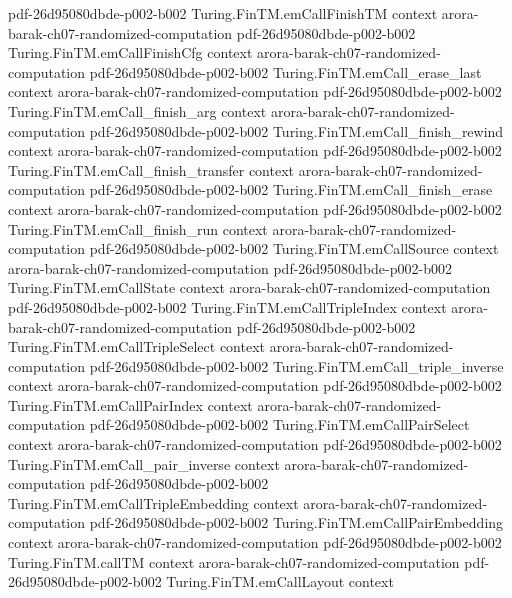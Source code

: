 \begin{theorem}
  {pdf-26d95080dbde-p002-b002}
\proofstep
  {Turing.FinTM.emCallFinishTM}
  {context}
  {arora-barak-ch07-randomized-computation}
  {pdf-26d95080dbde-p002-b002}
\proofstep
  {Turing.FinTM.emCallFinishCfg}
  {context}
  {arora-barak-ch07-randomized-computation}
  {pdf-26d95080dbde-p002-b002}
\proofstep
  {Turing.FinTM.emCall_erase_last}
  {context}
  {arora-barak-ch07-randomized-computation}
  {pdf-26d95080dbde-p002-b002}
\proofstep
  {Turing.FinTM.emCall_finish_arg}
  {context}
  {arora-barak-ch07-randomized-computation}
  {pdf-26d95080dbde-p002-b002}
\proofstep
  {Turing.FinTM.emCall_finish_rewind}
  {context}
  {arora-barak-ch07-randomized-computation}
  {pdf-26d95080dbde-p002-b002}
\proofstep
  {Turing.FinTM.emCall_finish_transfer}
  {context}
  {arora-barak-ch07-randomized-computation}
  {pdf-26d95080dbde-p002-b002}
\proofstep
  {Turing.FinTM.emCall_finish_erase}
  {context}
  {arora-barak-ch07-randomized-computation}
  {pdf-26d95080dbde-p002-b002}
\proofstep
  {Turing.FinTM.emCall_finish_run}
  {context}
  {arora-barak-ch07-randomized-computation}
  {pdf-26d95080dbde-p002-b002}
\proofstep
  {Turing.FinTM.emCallSource}
  {context}
  {arora-barak-ch07-randomized-computation}
  {pdf-26d95080dbde-p002-b002}
\proofstep
  {Turing.FinTM.emCallState}
  {context}
  {arora-barak-ch07-randomized-computation}
  {pdf-26d95080dbde-p002-b002}
\proofstep
  {Turing.FinTM.emCallTripleIndex}
  {context}
  {arora-barak-ch07-randomized-computation}
  {pdf-26d95080dbde-p002-b002}
\proofstep
  {Turing.FinTM.emCallTripleSelect}
  {context}
  {arora-barak-ch07-randomized-computation}
  {pdf-26d95080dbde-p002-b002}
\proofstep
  {Turing.FinTM.emCall_triple_inverse}
  {context}
  {arora-barak-ch07-randomized-computation}
  {pdf-26d95080dbde-p002-b002}
\proofstep
  {Turing.FinTM.emCallPairIndex}
  {context}
  {arora-barak-ch07-randomized-computation}
  {pdf-26d95080dbde-p002-b002}
\proofstep
  {Turing.FinTM.emCallPairSelect}
  {context}
  {arora-barak-ch07-randomized-computation}
  {pdf-26d95080dbde-p002-b002}
\proofstep
  {Turing.FinTM.emCall_pair_inverse}
  {context}
  {arora-barak-ch07-randomized-computation}
  {pdf-26d95080dbde-p002-b002}
\proofstep
  {Turing.FinTM.emCallTripleEmbedding}
  {context}
  {arora-barak-ch07-randomized-computation}
  {pdf-26d95080dbde-p002-b002}
\proofstep
  {Turing.FinTM.emCallPairEmbedding}
  {context}
  {arora-barak-ch07-randomized-computation}
  {pdf-26d95080dbde-p002-b002}
\proofstep
  {Turing.FinTM.callTM}
  {context}
  {arora-barak-ch07-randomized-computation}
  {pdf-26d95080dbde-p002-b002}
\proofstep
  {Turing.FinTM.emCallLayout}
  {context}

\end{theorem}
